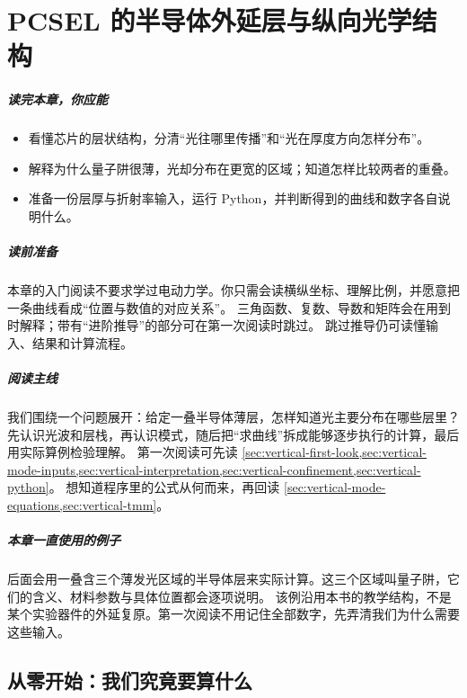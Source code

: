 ﻿%
\chapter{PCSEL 的半导体外延层与纵向光学结构}
\label{ch:epitaxial-optics}

\paragraph{读完本章，你应能}
\begin{itemize}
  \item 看懂芯片的层状结构，分清“光往哪里传播”和“光在厚度方向怎样分布”。
  \item 解释为什么量子阱很薄，光却分布在更宽的区域；知道怎样比较两者的重叠。
  \item 准备一份层厚与折射率输入，运行 Python，并判断得到的曲线和数字各自说明什么。
\end{itemize}

\paragraph{读前准备}
本章的入门阅读不要求学过电动力学。你只需会读横纵坐标、理解比例，并愿意把一条曲线看成“位置与数值的对应关系”。
三角函数、复数、导数和矩阵会在用到时解释；带有“进阶推导”的部分可在第一次阅读时跳过。
跳过推导仍可读懂输入、结果和计算流程。

\paragraph{阅读主线}
我们围绕一个问题展开：给定一叠半导体薄层，怎样知道光主要分布在哪些层里？
先认识光波和层栈，再认识模式，随后把“求曲线”拆成能够逐步执行的计算，最后用实际算例检验理解。
第一次阅读可先读 \cref{sec:vertical-first-look,sec:vertical-mode-inputs,sec:vertical-interpretation,sec:vertical-confinement,sec:vertical-python}。
想知道程序里的公式从何而来，再回读 \cref{sec:vertical-mode-equations,sec:vertical-tmm}。

\paragraph{本章一直使用的例子}
后面会用一叠含三个薄发光区域的半导体层来实际计算。这三个区域叫量子阱，它们的含义、材料参数与具体位置都会逐项说明。
该例沿用本书的教学结构，不是某个实验器件的外延复原。第一次阅读不用记住全部数字，先弄清我们为什么需要这些输入。

\section{从零开始：我们究竟要算什么}
\label{sec:vertical-first-look}
